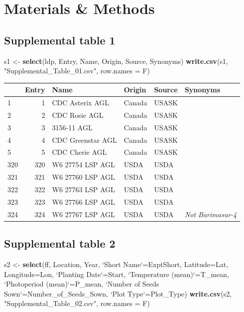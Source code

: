 \documentclass[
]{article}
\newenvironment{Shaded}{\begin{snugshade}}{\end{snugshade}}
\newcommand{\DataTypeTok}[1]{\textcolor[rgb]{0.13,0.29,0.53}{#1}}
\newcommand{\KeywordTok}[1]{\textcolor[rgb]{0.13,0.29,0.53}{\textbf{#1}}}
\newcommand{\NormalTok}[1]{#1}
\newcommand{\StringTok}[1]{\textcolor[rgb]{0.31,0.60,0.02}{#1}}
\begin{document}
\hypertarget{materials-methods}{%
\section{Materials \& Methods}\label{materials-methods}}

\hypertarget{supplemental-table-1}{%
\subsection{Supplemental table 1}\label{supplemental-table-1}}

\begin{Shaded}
\begin{Highlighting}[]
\NormalTok{s1 <-}\StringTok{ }\KeywordTok{select}\NormalTok{(ldp, Entry, Name, Origin, Source, Synonyms)}
\KeywordTok{write.csv}\NormalTok{(s1, }\StringTok{"Supplemental_Table_01.csv"}\NormalTok{, }\DataTypeTok{row.names =}\NormalTok{ F)}
\end{Highlighting}
\end{Shaded}

\begin{longtable}[]{@{}lrllll@{}}
\toprule
& Entry & Name & Origin & Source & Synonyms\tabularnewline
\midrule
\endhead
1 & 1 & CDC Asterix AGL & Canada & USASK &\tabularnewline
2 & 2 & CDC Rosie AGL & Canada & USASK &\tabularnewline
3 & 3 & 3156-11 AGL & Canada & USASK &\tabularnewline
4 & 4 & CDC Greenstar AGL & Canada & USASK &\tabularnewline
5 & 5 & CDC Cherie AGL & Canada & USASK &\tabularnewline
320 & 320 & W6 27754 LSP AGL & USDA & USDA &\tabularnewline
321 & 321 & W6 27760 LSP AGL & USDA & USDA &\tabularnewline
322 & 322 & W6 27763 LSP AGL & USDA & USDA &\tabularnewline
323 & 323 & W6 27766 LSP AGL & USDA & USDA &\tabularnewline
324 & 324 & W6 27767 LSP AGL & USDA & USDA & \emph{Not
Barimasur-4}\tabularnewline
\bottomrule
\end{longtable}

\hypertarget{supplemental-table-2}{%
\subsection{Supplemental table 2}\label{supplemental-table-2}}

\begin{Shaded}
\begin{Highlighting}[]
\NormalTok{s2 <-}\StringTok{ }\KeywordTok{select}\NormalTok{(ff, Location, Year, }\StringTok{`}\DataTypeTok{Short Name}\StringTok{`}\NormalTok{=ExptShort, }\DataTypeTok{Latitude=}\NormalTok{Lat, }\DataTypeTok{Longitude=}\NormalTok{Lon,}
  \StringTok{`}\DataTypeTok{Planting Date}\StringTok{`}\NormalTok{=Start, }\StringTok{`}\DataTypeTok{Temperature (mean)}\StringTok{`}\NormalTok{=T_mean, }\StringTok{`}\DataTypeTok{Photoperiod (mean)}\StringTok{`}\NormalTok{=P_mean, }
  \StringTok{`}\DataTypeTok{Number of Seeds Sown}\StringTok{`}\NormalTok{=Number_of_Seeds_Sown, }\StringTok{`}\DataTypeTok{Plot Type}\StringTok{`}\NormalTok{=Plot_Type)}
\KeywordTok{write.csv}\NormalTok{(s2, }\StringTok{"Supplemental_Table_02.csv"}\NormalTok{, }\DataTypeTok{row.names =}\NormalTok{ F)}
\end{Highlighting}
\end{Shaded}
\end{document}
